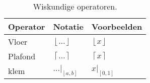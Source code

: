 \begin{table}
  \centering
  \begin{tabular}{@{}lll@{}}\toprule
    Operator       & Notatie        & Voorbeelden \\ \midrule
    Vloer          & $\left \lfloor{\dots}\right \rfloor$ & $\left \lfloor{x}\right \rfloor$\\
    Plafond        & $\left \lceil{\dots}\right \rceil$ & $\left \lceil{x}\right \rceil$\\
    klem           & $\dots|_{[a,b]}$ & $x|_{[0, 1]}$ \\ \bottomrule
  \end{tabular}
  \caption{Wiskundige operatoren.}
  \label{tbl:math-operators}
\end{table}
